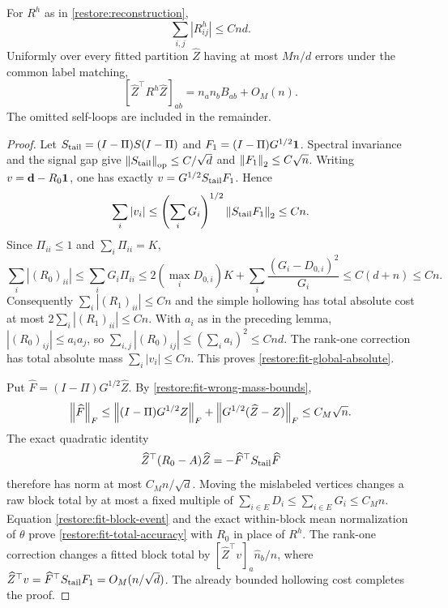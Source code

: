 \begin{lemma}
\label{restore:fit-block-totals}
For $R^h$ as in \eqref{restore:reconstruction},
\begin{equation}\label{restore:fit-global-absolute}
 \sum_{i,j}|R^h_{ij}|\le Cnd.
\end{equation}
Uniformly over every fitted partition $\widehat Z$ having at most
$Mn/d$ errors under the common label matching,
\begin{equation}\label{restore:fit-total-accuracy}
 [\widehat Z^\top R^h\widehat Z]_{ab}
       =n_an_bB_{ab}+O_M(n).
\end{equation}
The omitted self-loops are included in the remainder.
\end{lemma}

\begin{proof}
Let $S_{\rm tail}=(I-\Pi)S(I-\Pi)$ and
$F_1=(I-\Pi)G^{1/2}\mathbf 1$. Spectral invariance and the signal gap give
$\left\lVert S_{\rm tail}\right\rVert_{\mathrm{op}}\le C/\sqrt d$ and
$\left\lVert F_1\right\rVert_2\le C\sqrt n$.
Writing $v=\mathbf d-R_0\mathbf 1$, one has exactly
$v=G^{1/2}S_{\rm tail}F_1$. Hence
\[
 \sum_i|v_i|
 \le\left(\sum_iG_i\right)^{1/2}
          \left\lVert S_{\rm tail}F_1\right\rVert_2\le Cn.
\]
Since $\Pi_{ii}\le1$ and $\sum_i\Pi_{ii}=K$,
\[
 \sum_i|(R_0)_{ii}|
 \le\sum_iG_i\Pi_{ii}
 \le2(\max_iD_{0,i})K
       +\sum_i\frac{(G_i-D_{0,i})^2}{G_i}
 \le C(d+n)\le Cn.
\]
Consequently $\sum_i|(R_1)_{ii}|\le Cn$ and the simple hollowing
has total absolute cost at most $2\sum_i|(R_1)_{ii}|\le Cn$.
With $a_i$ as in the preceding lemma,
$|(R_0)_{ij}|\le a_ia_j$, so
$\sum_{i,j}|(R_0)_{ij}|\le(\sum_i a_i)^2\le Cnd$.
The rank-one correction has total absolute mass $\sum_i|v_i|\le Cn$.
This proves \eqref{restore:fit-global-absolute}.

Put $\widehat F=(I-\Pi)G^{1/2}\widehat Z$. By
\eqref{restore:fit-wrong-mass-bounds},
\[
 \left\lVert\widehat F\right\rVert_F
 \le\left\lVert(I-\Pi)G^{1/2}Z\right\rVert_F
       +\left\lVert G^{1/2}(\widehat Z-Z)\right\rVert_F
 \le C_M\sqrt n .
\]
The exact quadratic identity
\[
 \widehat Z^\top(R_0-A)\widehat Z
       =-\widehat F^\top S_{\rm tail}\widehat F
\]
therefore has norm at most $C_Mn/\sqrt d$. Moving the mislabeled
vertices changes a raw block total by at most a fixed multiple of
$\sum_{i\in E}D_i\le\sum_{i\in E}G_i\le C_Mn$.
Equation \eqref{restore:fit-block-event} and the exact within-block
mean normalization of $\theta$ prove \eqref{restore:fit-total-accuracy}
with $R_0$ in place of $R^h$.
The rank-one correction changes a fitted block total by
$[\widehat Z^\top v]_a\widehat n_b/n$, where
$\widehat Z^\top v=\widehat F^\top S_{\rm tail}F_1=O_M(n/\sqrt d)$.
The already bounded hollowing cost completes the proof.
\end{proof}


